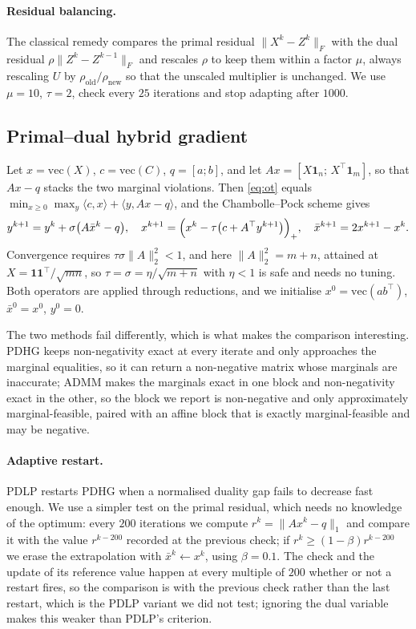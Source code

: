 \documentclass{article}
\begin{document}
\paragraph{Residual balancing.}
The classical remedy \citep{he2012rate,goldstein2014} compares the primal residual
$\|X^k-Z^k\|_F$ with the dual residual $\rho\|Z^k-Z^{k-1}\|_F$ and rescales $\rho$ to keep
them within a factor $\mu$, always rescaling $U$ by
$\rho_{\text{old}}/\rho_{\text{new}}$ so that the unscaled multiplier is unchanged. We
use $\mu=10$, $\tau=2$, check every $25$ iterations and stop adapting after $1000$.

\subsection{Primal--dual hybrid gradient}
\label{sec:pdhg}

Let $x=\mathrm{vec}(X)$, $c=\mathrm{vec}(C)$, $q=[a;b]$, and let
$Ax=[X\mathbf 1_n;\,X^\top\mathbf 1_m]$, so that $Ax-q$ stacks the two marginal
violations. Then \eqref{eq:ot} equals
$\min_{x\ge0}\max_y\langle c,x\rangle+\langle y,Ax-q\rangle$, and the Chambolle--Pock
scheme \citep{chambolle2011} gives
\begin{equation}
\label{eq:pdhg}
y^{k+1}=y^k+\sigma\bigl(A\bar x^k-q\bigr),\quad
x^{k+1}=\Bigl(x^k-\tau\bigl(c+A^\top y^{k+1}\bigr)\Bigr)_+ ,\quad
\bar x^{k+1}=2x^{k+1}-x^k .
\end{equation}
Convergence requires $\tau\sigma\|A\|_2^2<1$, and here $\|A\|_2^2=m+n$, attained at
$X=\mathbf 1\mathbf 1^\top/\sqrt{mn}$, so $\tau=\sigma=\eta/\sqrt{m+n}$ with $\eta<1$ is
safe and needs no tuning. Both operators are applied through reductions, and we
initialise $x^0=\mathrm{vec}(ab^\top)$, $\bar x^0=x^0$, $y^0=0$.

The two methods fail differently, which is what makes the comparison interesting. PDHG
keeps non-negativity exact at every iterate and only approaches the marginal equalities,
so it can return a non-negative matrix whose marginals are inaccurate; ADMM makes the
marginals exact in one block and non-negativity exact in the other, so the block we
report is non-negative and only approximately marginal-feasible, paired with an affine
block that is exactly marginal-feasible and may be negative.

\paragraph{Adaptive restart.}
PDLP \citep{applegate2021pdlp} restarts PDHG when a normalised duality gap fails to
decrease fast enough. We use a simpler test on the primal residual, which needs no
knowledge of the optimum: every $200$ iterations we compute $r^k=\|Ax^k-q\|_1$ and
compare it with the value $r^{k-200}$ recorded at the previous check; if
$r^k\ge(1-\beta)r^{k-200}$ we erase the extrapolation with $\bar x^k\leftarrow x^k$,
using $\beta=0.1$. The check and the update of its reference value happen at every
multiple of $200$ whether or not a restart fires, so the comparison is with the previous
check rather than the last restart, which is the PDLP variant we did not test; ignoring
the dual variable makes this weaker than PDLP's criterion.
\end{document}
